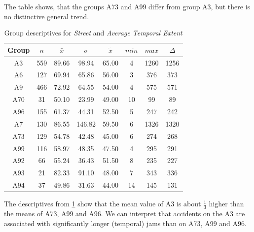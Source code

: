 The table shows, that the groups A73 and A99 differ from group A3, but there is no distinctive general trend.
\begin{table}[ht!]
	\tiny
	\centering
	\begin{tabular}{c|c|c|c|c|c|c|c}
		\toprule
		Group & $n$ & $\bar{x}$ & $\sigma$ & $\tilde{x}$ & $min$ & $max$ & $\Delta$ \\  
		\midrule
		A3  & 559 & 89.66 & 98.94  & 65.00 & 4  & 1260 & 1256 \\ 
		A6  & 127 & 69.94 & 65.86  & 56.00 & 3  & 376  & 373  \\ 
		A9  & 466 & 72.92 & 64.55  & 54.00 & 4  & 575  & 571  \\ 
		A70 & 31  & 50.10 & 23.99  & 49.00 & 10 & 99   & 89   \\ 
		A96 & 155 & 61.37 & 44.31  & 52.50 & 5  & 247  & 242  \\ 
		A7  & 130 & 86.55 & 146.82 & 59.50 & 6  & 1326 & 1320 \\ 
		A73 & 129 & 54.78 & 42.48  & 45.00 & 6  & 274  & 268  \\ 
		A99 & 116 & 58.97 & 48.35  & 47.50 & 4  & 295  & 291  \\ 
		A92 & 66  & 55.24 & 36.43  & 51.50 & 8  & 235  & 227  \\ 
		A93 & 21  & 82.33 & 91.10  & 48.00 & 7  & 343  & 336  \\ 
		A94 & 37  & 49.86 & 31.63  & 44.00 & 14 & 145  & 131  \\ 
		\bottomrule
	\end{tabular}
	\caption{Group descriptives for \textit{Street} and \textit{Average Temporal Extent}}
	\label{tbl:descriptives_baysis_matched_Str_TAvg}
\end{table}
The descriptives from \cref{tbl:descriptives_baysis_matched_Str_TAvg} show that the mean value of A3 is about $\frac{1}{3}$ higher than the means of A73, A99 and A96. We can interpret that accidents on the A3 are associated with significantly longer (temporal) jams than on A73, A99 and A96.

